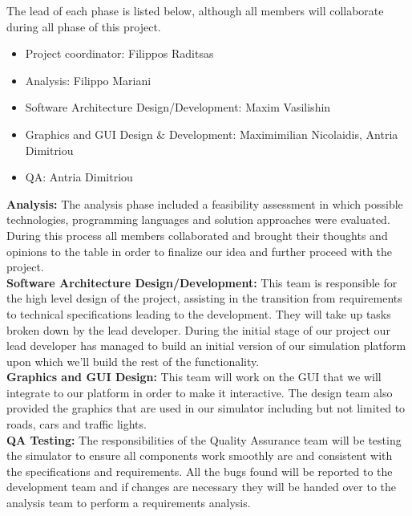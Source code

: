 \documentclass[oneside]{article}
\begin{document}
\noindent The lead of each phase is listed below, although all members will collaborate during all phase of this project.  

\begin{itemize}
\setlength\itemsep{-0.5em}
\item Project coordinator: Filippos Raditsas
\item Analysis: Filippo Mariani
\item Software Architecture Design/Development: Maxim Vasilishin
\item Graphics and GUI Design \& Development: Maximimilian Nicolaidis, Antria Dimitriou
\item QA: Antria Dimitriou
\end{itemize}

\noindent \textbf{Analysis:} The analysis phase included a feasibility assessment in which possible technologies, programming languages and solution approaches were evaluated. During this process all members collaborated and brought their thoughts and opinions to the table in order to finalize our idea and further proceed with the project.\\
\newline
\noindent \textbf{Software Architecture Design/Development:} This team is responsible for the high level design of the project, assisting in the transition from requirements to technical specifications leading to the development. They will take up tasks broken down by the lead developer. During the initial stage of our project our lead developer has managed to build an initial version of our simulation platform upon which we'll build the rest of the functionality.\\
\newline
\noindent \textbf{Graphics and GUI Design:} This team will work on the GUI that we will integrate to our platform in order to make it interactive. The design team also provided the graphics that are used in our simulator including but not limited to roads, cars and traffic lights.\\ 
\newline
\noindent \textbf{QA Testing:} The responsibilities of the Quality Assurance team will be testing the simulator to ensure all components work smoothly are and consistent with the specifications and requirements. All the bugs found will be reported to the development team and if changes are necessary they will be handed over to the analysis team to perform a requirements analysis.
\end{document}
